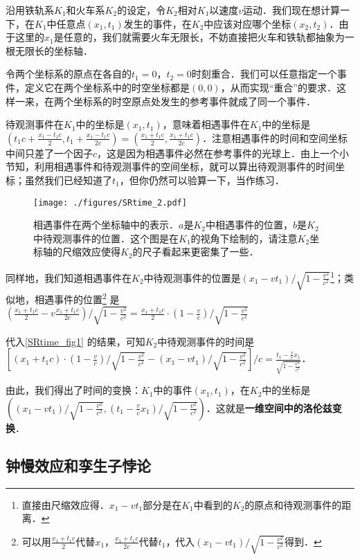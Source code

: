 沿用铁轨系$K_1$和火车系$K_2$的设定，令$K_2$相对$K_1$以速度$v$运动．我们现在想计算一下，在$K_1$中任意点$(x_1,t_1)$发生的事件，在$K_2$中应该对应哪个坐标$(x_2,t_2)$．由于这里的$x_1$是任意的，我们就需要火车无限长，不妨直接把火车和铁轨都抽象为一根无限长的坐标轴．

令两个坐标系的原点在各自的$t_1=0$，$t_2=0$时刻重合．我们可以任意指定一个事件，定义它在两个坐标系中的时空坐标都是$(0,0)$，从而实现“重合”的要求．这样一来，在两个坐标系的时空原点处发生的参考事件就成了同一个事件．

待观测事件在$K_1$中的坐标是$(x_1, t_1)$，意味着相遇事件在$K_1$中的坐标是$(t_1c+\frac{x_1-t_1c}{2}, t_1+\frac{x_1-t_1c}{2c})=(\frac{x_1+t_1c}{2},\frac{x_1+t_1c}{2c})$．注意相遇事件的时间和空间坐标中间只差了一个因子$c$，这是因为相遇事件必然在参考事件的光球上．由上一个小节知，利用相遇事件和待观测事件的空间坐标，就可以算出待观测事件的时间坐标；虽然我们已经知道了$t_1$，但你仍然可以验算一下，当作练习．

\begin{figure}[ht]
\centering
\texttt{[image: ./figures/SRtime\_2.pdf]}
\caption{相遇事件在两个坐标轴中的表示．$a$是$K_2$中相遇事件的位置，$b$是$K_2$中待观测事件的位置．这个图是在$K_1$的视角下绘制的，请注意$K_2$坐标轴的尺缩效应使得$K_2$的尺子看起来更密集了一些．} \label{SRtime_fig2}
\end{figure}

同样地，我们知道相遇事件在$K_2$中待观测事件的位置是$(x_1-vt_1)/\sqrt{1-\frac{v^2}{c^2}}$\footnote{直接由尺缩效应得．$x_1-vt_1$部分是在$K_1$中看到的$K_2$的原点和待观测事件的距离．}；类似地，相遇事件的位置\footnote{可以用$\frac{x_1+t_1c}{2}$代替$x_1$，$\frac{x_1+t_1c}{2c}$代替$t_1$，代入$(x_1-vt_1)/\sqrt{1-\frac{v^2}{c^2}}$得到．}  是$(\frac{x_1+t_1c}{2}-v\frac{x_1+t_1c}{2c})/\sqrt{1-\frac{v^2}{c^2}}=\frac{x_1+t_1c}{2}\cdot(1-\frac{v}{c})/\sqrt{1-\frac{v^2}{c^2}}$

代入\autoref{SRtime_fig1} 的结果，可知$K_2$中待观测事件的时间是$[(x_1+t_1c)\cdot(1-\frac{v}{c})/\sqrt{1-\frac{v^2}{c^2}}-(x_1-vt_1)/\sqrt{1-\frac{v^2}{c^2}}]/c=\frac{t_1-\frac{v}{c}x_1}{\sqrt{1-\frac{v^2}{c^2}}}$．

由此，我们得出了时间的变换：$K_1$中的事件$(x_1, t_1)$，在$K_2$中的坐标是$((x_1-vt_1)/\sqrt{1-\frac{v^2}{c^2}}, (t_1-\frac{v}{c}x_1)/\sqrt{1-\frac{v^2}{c^2}})$．这就是\textbf{一维空间中的洛伦兹变换}．

\subsection{钟慢效应和孪生子悖论}


